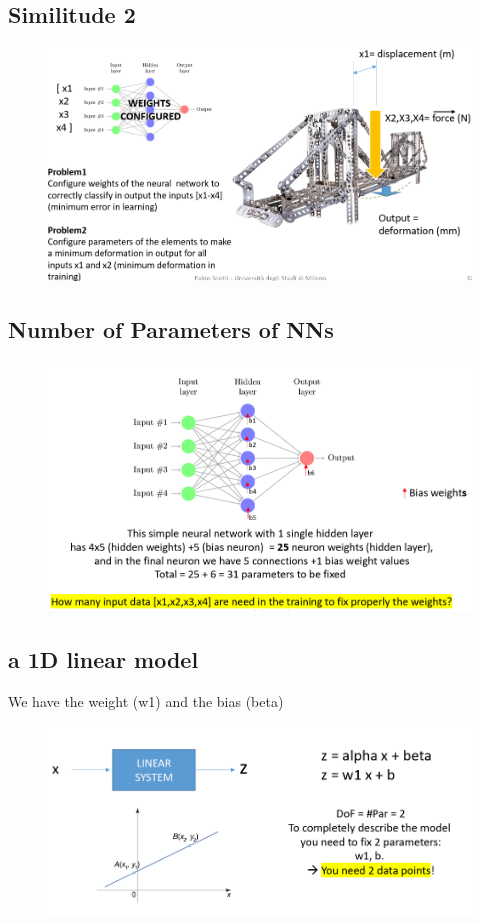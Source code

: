 \subsection{Similitude 2}
\begin{figure}[H]
    \centering
    \includegraphics[width=0.8\linewidth]{07-08/images/similitude 2.png}
\end{figure}

\subsection{Number of Parameters of NNs}
\begin{figure}[H]
    \centering
    \includegraphics[width=0.8\linewidth]{07-08/images/nns.png}
\end{figure}

\subsection{a 1D linear model}
\noindent We have the weight (w1) and the bias (beta)
\begin{figure}[H]
    \centering
    \includegraphics[width=0.8\linewidth]{07-08/images/d1.png}
\end{figure}

